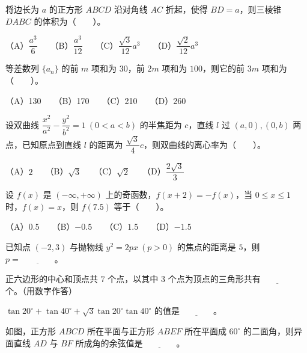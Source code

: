 \begin{question}
将边长为 $a$ 的正方形 $ABCD$ 沿对角线 $AC$ 折起，使得 $BD=a$，则三棱锥 $DABC$ 的体积为\mbox{（　　）}。

（A）$\dfrac{a^3}{6}$　　（B）$\dfrac{a^3}{12}$　　（C）$\dfrac{\sqrt{3}}{12}a^3$　　（D）$\dfrac{\sqrt{2}}{12}a^3$

\end{question}
\begin{question}
等差数列 $\{a_n\}$ 的前 $m$ 项和为 $30$，前 $2m$ 项和为 $100$，则它的前 $3m$ 项和为\mbox{（　　）}。

（A）130　　（B）170　　（C）210　　（D）260

\end{question}
\begin{question}
设双曲线 $\dfrac{x^2}{a^2}-\dfrac{y^2}{b^2}=1\ (0<a<b)$ 的半焦距为 $c$，直线 $l$ 过 $(a,0),(0,b)$ 两点，已知原点到直线 $l$ 的距离为 $\dfrac{\sqrt{3}}{4}c$，则双曲线的离心率为\mbox{（　　）}。

（A）$2$　　（B）$\sqrt{3}$　　（C）$\sqrt{2}$　　（D）$\dfrac{2\sqrt{3}}{3}$

\end{question}
\begin{question}
设 $f(x)$ 是 $(-\infty,+\infty)$ 上的奇函数，$f(x+2)=-f(x)$，当 $0\le x\le1$ 时，$f(x)=x$，则 $f(7.5)$ 等于\mbox{（　　）}。

（A）$0.5$　　（B）$-0.5$　　（C）$1.5$　　（D）$-1.5$

\end{question}
\begin{question}
已知点 $(-2,3)$ 与抛物线 $y^2=2px\ (p>0)$ 的焦点的距离是 $5$，则 $p=\underline{\qquad\qquad}$。

\end{question}
\begin{question}
正六边形的中心和顶点共 $7$ 个点，以其中 $3$ 个点为顶点的三角形共有$\underline{\qquad\qquad}$个。（用数字作答）

\end{question}
\begin{question}
$\tan20^\circ+\tan40^\circ+\sqrt{3}\tan20^\circ\tan40^\circ$ 的值是$\underline{\qquad\qquad}$。

\Needspace{0.4\textheight}
\end{question}
\begin{question}
如图，正方形 $ABCD$ 所在平面与正方形 $ABEF$ 所在平面成 $60^\circ$ 的二面角，则异面直线 $AD$ 与 $BF$ 所成角的余弦值是$\underline{\qquad\qquad}$。
\nopagebreak[4]
\begin{center}\end{center}
\nopagebreak[4]
\end{question}

